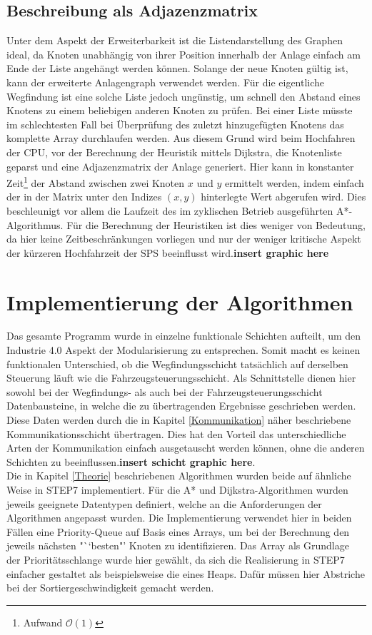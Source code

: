 		\subsection{Beschreibung als Adjazenzmatrix}
			\label{Adjazenzmatrix}
			Unter dem Aspekt der Erweiterbarkeit ist die Listendarstellung des Graphen ideal, da Knoten unabhängig von ihrer Position innerhalb der Anlage einfach am Ende der Liste angehängt werden können. Solange der neue Knoten gültig ist, kann der erweiterte Anlagengraph verwendet werden. Für die eigentliche Wegfindung ist eine solche Liste jedoch ungünstig, um schnell den Abstand eines Knotens zu einem beliebigen anderen Knoten zu prüfen. Bei einer Liste müsste im schlechtesten Fall bei Überprüfung des zuletzt hinzugefügten Knotens das komplette Array durchlaufen werden. Aus diesem Grund wird beim Hochfahren der CPU, vor der Berechnung der Heuristik mittels Dijkstra, die Knotenliste geparst und eine Adjazenzmatrix der Anlage generiert. Hier kann in konstanter Zeit\footnote{Aufwand $\mathcal{O}(1)$} der Abstand zwischen zwei Knoten $x$ und $y$ ermittelt werden, indem einfach der in der Matrix unter den Indizes $(x,y)$ hinterlegte Wert abgerufen wird. Dies beschleunigt vor allem die Laufzeit des im zyklischen Betrieb ausgeführten A*-Algorithmus. Für die Berechnung der Heuristiken ist dies weniger von Bedeutung, da hier keine Zeitbeschränkungen vorliegen und nur der weniger kritische Aspekt der kürzeren Hochfahrzeit der \ac{SPS} beeinflusst wird.\textbf{insert graphic here}

	\section{Implementierung der Algorithmen}
	
		Das gesamte Programm wurde in einzelne funktionale Schichten aufteilt, um den Industrie 4.0 Aspekt der Modularisierung zu entsprechen. Somit macht es keinen funktionalen Unterschied, ob die Wegfindungsschicht tatsächlich auf derselben Steuerung läuft wie die Fahrzeugsteuerungsschicht. Als Schnittstelle dienen hier sowohl bei der Wegfindungs- als auch bei der Fahrzeugsteuerungsschicht  Datenbausteine, in welche die zu übertragenden Ergebnisse geschrieben werden. Diese Daten werden durch die in Kapitel \ref{Kommunikation} näher beschriebene Kommunikationsschicht übertragen. Dies hat den Vorteil das unterschiedliche Arten der Kommunikation einfach ausgetauscht werden können, ohne die anderen Schichten zu beeinflussen.\textbf{insert schicht graphic here}.
		\\
		Die in Kapitel \ref{Theorie} beschriebenen Algorithmen wurden beide auf ähnliche Weise in \ac{STEP7} implementiert. Für die A* und Dijkstra-Algorithmen wurden jeweils geeignete Datentypen definiert, welche an die Anforderungen der Algorithmen angepasst wurden. Die Implementierung verwendet hier in beiden Fällen eine Priority-Queue auf Basis eines Arrays, um bei der Berechnung den jeweils nächsten "``besten"' Knoten zu identifizieren. Das Array als Grundlage der Prioritätsschlange wurde hier gewählt, da sich die Realisierung in \ac{STEP7} einfacher gestaltet als beispielsweise die eines Heaps. Dafür müssen hier Abstriche bei der Sortiergeschwindigkeit gemacht werden.
		
